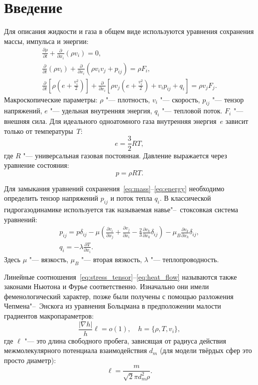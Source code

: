 \documentclass[english,russian,a4paper,12pt]{article}
\newcommand{\pder}[2][]{\frac{\partial#1}{\partial#2}}
\begin{document}
\tableofcontents

\section{Введение}

Для описания жидкости и газа в общем виде используются уравнения сохранения массы, импульса и энергии:
\begin{gather}
	\pder[\rho]{t} + \pder{x_i}(\rho v_i) = 0, \label{eq:mass}\\
	\pder{t}(\rho v_i) + \pder{x_i}(\rho v_i v_j + p_{ij}) = \rho F_i, \label{eq:momentum}\\
	\pder{t}\left[\rho\left(e+\frac{v_i^2}2\right)\right] +
		\pder{x_i}\left[\rho v_j\left(e+\frac{v_i^2}2\right)+v_i p_{ij}+q_i\right] = \rho v_j F_j. \label{eq:energy}
\end{gather}
Макроскопические параметры: \(\rho\) "--- плотность, \(v_i\) "--- скорость, \(p_{ij}\) "--- тензор напряжений,
\(e\) "--- удельная внутренняя энергия, \(q_i\) "--- тепловой поток. \(F_i\) "--- внешняя сила.
Для идеального одноатомного газа внутренняя энергия~\(e\) зависит только от температуры~\(T\):
\[ e = \frac32RT,\]
где \(R\) "--- универсальная газовая постоянная. Давление выражается через уравнение состояния:
\[ p = \rho RT. \]

Для замыкания уравнений сохранения~\eqref{eq:mass}--\eqref{eq:energy}
необходимо определить тензор напряжений \(p_{ij}\) и поток тепла \(q_i\).
В классической гидрогазодинамике используется так называемая навье"--~стоксовкая система уравнений:
\begin{gather}
	p_{ij} = p\delta_{ij} - \mu\left(\pder[v_i]{x_j}+\pder[v_j]{x_i}-\frac23\pder[v_k]{x_k}\delta_{ij}\right) -
		\mu_B\pder[v_k]{x_k}\delta_{ij}, \label{eq:stress_tensor}\\
	q_i = -\lambda\pder[T]{x_i}. \label{eq:heat_flow}
\end{gather}
Здесь \(\mu\) "--- вязкость, \(\mu_B\) "--- вторая вязкость, \(\lambda\) "--- теплопроводность. 

Линейные соотношения~\eqref{eq:stress_tensor}--\eqref{eq:heat_flow} называются
также законами Ньютона и Фурье соответственно.
Изначально они имели феменологический характер, позже были получены с помощью разложения Чепмена"--~Энскога
из уравнения Больцмана в предположении малости градиентов макропараметров:
\[ \frac{|\nabla h|}{h}\ell = o(1), \quad h = \{\rho, T, v_i\}, \]
где \(\ell\) "--- это длина свободного пробега,
зависящая от радиуса действия межмолекулярного потенциала взаимодействия \(d_m\)
(для модели твёрдых сфер это просто диаметр):
\begin{equation}
	\ell = \frac{m}{\sqrt2\pi d_m^2 \rho}.
\end{equation}
\end{document}
